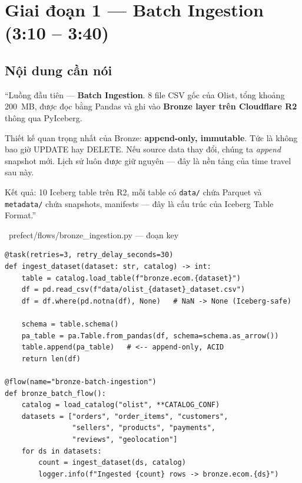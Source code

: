 \documentclass[12pt, a4paper]{article}
\newenvironment{speakerbox}[2]{%
  \begin{tcolorbox}[
    enhanced, breakable,
    colback=#1!6!white, colframe=#1,
    colbacktitle=#1, coltitle=white,
    fonttitle=\bfseries\large,
    title={#2},
    arc=4pt, boxrule=1.5pt,
    left=8pt, right=8pt, top=6pt, bottom=6pt,
  ]
}{\end{tcolorbox}}
\begin{document}
\section{Giai đoạn 1 --- Batch Ingestion (3:10 -- 3:40)}

\begin{speakerbox}{p2color}{\faUser\ Người 2 \textbullet\ 3:10 -- 3:40 \textbullet\ Lời nói}

\subsection*{Nội dung cần nói}

\begin{scriptbox}
``Luồng đầu tiên --- \textbf{Batch Ingestion}. 8 file CSV gốc của Olist,
tổng khoảng 200~MB, được đọc bằng Pandas và ghi vào
\textbf{Bronze layer trên Cloudflare R2} thông qua PyIceberg.

Thiết kế quan trọng nhất của Bronze: \textbf{append-only, immutable}.
Tức là không bao giờ UPDATE hay DELETE. Nếu source data thay đổi,
chúng ta \textit{append} snapshot mới. Lịch sử luôn được giữ
nguyên --- đây là nền tảng của time travel sau này.

Kết quả: 10 Iceberg table trên R2, mỗi table có \texttt{data/} chứa
Parquet và \texttt{metadata/} chứa snapshots, manifests --- đây là cấu trúc
của Iceberg Table Format.''
\end{scriptbox}

\end{speakerbox}

\vspace{0.5em}

\begin{codebox}{\faCode\ prefect/flows/bronze\_ingestion.py --- đoạn key}
\begin{verbatim}
@task(retries=3, retry_delay_seconds=30)
def ingest_dataset(dataset: str, catalog) -> int:
    table = catalog.load_table(f"bronze.ecom.{dataset}")
    df = pd.read_csv(f"data/olist_{dataset}_dataset.csv")
    df = df.where(pd.notna(df), None)   # NaN -> None (Iceberg-safe)

    schema = table.schema()
    pa_table = pa.Table.from_pandas(df, schema=schema.as_arrow())
    table.append(pa_table)   # <-- append-only, ACID
    return len(df)

@flow(name="bronze-batch-ingestion")
def bronze_batch_flow():
    catalog = load_catalog("olist", **CATALOG_CONF)
    datasets = ["orders", "order_items", "customers",
                "sellers", "products", "payments",
                "reviews", "geolocation"]
    for ds in datasets:
        count = ingest_dataset(ds, catalog)
        logger.info(f"Ingested {count} rows -> bronze.ecom.{ds}")
\end{verbatim}
\end{codebox}
\end{document}
